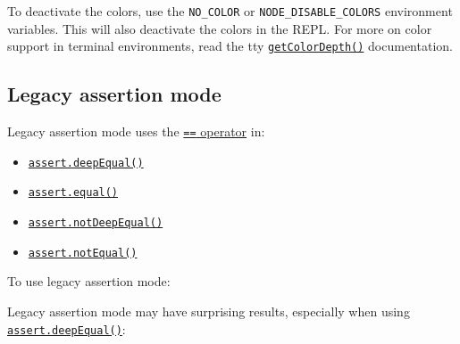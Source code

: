 To deactivate the colors, use the \texttt{NO\_COLOR} or
\texttt{NODE\_DISABLE\_COLORS} environment variables. This will also
deactivate the colors in the REPL. For more on color support in terminal
environments, read the tty
\href{tty.md\#writestreamgetcolordepthenv}{\texttt{getColorDepth()}}
documentation.

\subsection{Legacy assertion mode}\label{legacy-assertion-mode}

Legacy assertion mode uses the
\href{https://developer.mozilla.org/en-US/docs/Web/JavaScript/Reference/Operators/Equality}{\texttt{==}
operator} in:

\begin{itemize}
\tightlist
\item
  \hyperref[assertdeepequalactual-expected-message]{\texttt{assert.deepEqual()}}
\item
  \hyperref[assertequalactual-expected-message]{\texttt{assert.equal()}}
\item
  \hyperref[assertnotdeepequalactual-expected-message]{\texttt{assert.notDeepEqual()}}
\item
  \hyperref[assertnotequalactual-expected-message]{\texttt{assert.notEqual()}}
\end{itemize}

To use legacy assertion mode:

\begin{Shaded}
\begin{Highlighting}[]
 \OperatorTok{;}
\end{Highlighting}
\end{Shaded}

\begin{Shaded}
\begin{Highlighting}[]
\OperatorTok{=} \NormalTok{(}\NormalTok{)}\OperatorTok{;}
\end{Highlighting}
\end{Shaded}

Legacy assertion mode may have surprising results, especially when using
\hyperref[assertdeepequalactual-expected-message]{\texttt{assert.deepEqual()}}:

\begin{Shaded}
\begin{Highlighting}[]
\CommentTok{// }
\NormalTok{(}\OperatorTok{,}  \NormalTok{())}\OperatorTok{;}
\end{Highlighting}
\end{Shaded}


